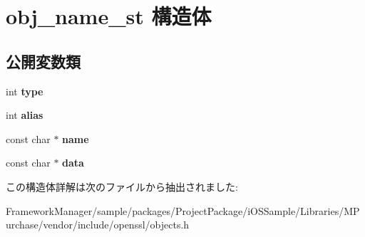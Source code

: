 \hypertarget{structobj__name__st}{}\section{obj\+\_\+name\+\_\+st 構造体}
\label{structobj__name__st}
\subsection*{公開変数類}
\begin{DoxyCompactItemize}
\item 
\hypertarget{structobj__name__st_ac9b1720c0e892bb82abafa95f4c28bfd}{}int {\bfseries type}\label{structobj__name__st_ac9b1720c0e892bb82abafa95f4c28bfd}

\item 
\hypertarget{structobj__name__st_a436535b057606678c612d6e0ff87b301}{}int {\bfseries alias}\label{structobj__name__st_a436535b057606678c612d6e0ff87b301}

\item 
\hypertarget{structobj__name__st_a123db40ac48c32bf473c4bdd0dd961fc}{}const char $\ast$ {\bfseries name}\label{structobj__name__st_a123db40ac48c32bf473c4bdd0dd961fc}

\item 
\hypertarget{structobj__name__st_afdb47f10daa01b71995d9b30d696ac68}{}const char $\ast$ {\bfseries data}\label{structobj__name__st_afdb47f10daa01b71995d9b30d696ac68}

\end{DoxyCompactItemize}


この構造体詳解は次のファイルから抽出されました\+:\begin{DoxyCompactItemize}
\item 
Framework\+Manager/sample/packages/\+Project\+Package/i\+O\+S\+Sample/\+Libraries/\+M\+Purchase/vendor/include/openssl/objects.\+h\end{DoxyCompactItemize}
